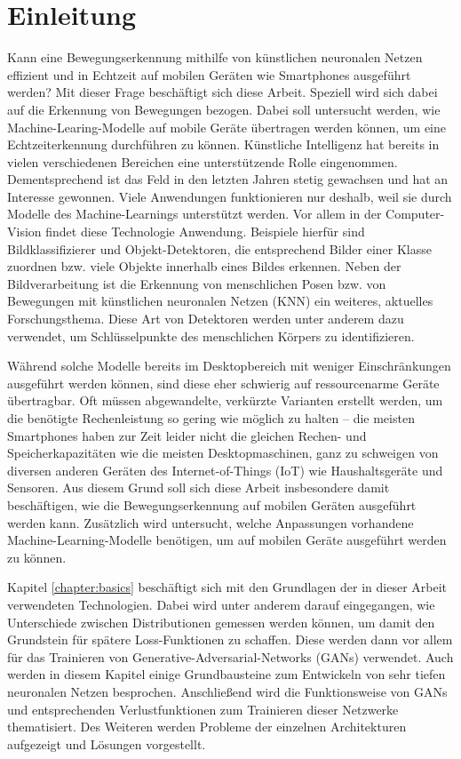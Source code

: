 \chapter{Einleitung}
Kann eine Bewegungserkennung mithilfe von künstlichen neuronalen Netzen
effizient und in Echtzeit auf mobilen Geräten wie Smartphones ausgeführt
werden? Mit dieser Frage beschäftigt sich diese Arbeit. Speziell wird
sich dabei auf die Erkennung von Bewegungen bezogen. Dabei soll untersucht
werden, wie Machine-Learing-Modelle auf mobile Geräte übertragen werden können,
um eine Echtzeiterkennung durchführen zu können. Künstliche Intelligenz hat
bereits in vielen verschiedenen Bereichen eine unterstützende Rolle
eingenommen.  Dementsprechend ist das Feld in den letzten Jahren stetig
gewachsen und hat an Interesse gewonnen. Viele Anwendungen funktionieren nur
deshalb, weil sie durch Modelle des Machine-Learnings unterstützt werden. Vor
allem in der Computer-Vision findet diese Technologie Anwendung. Beispiele
hierfür sind Bildklassifizierer und Objekt-Detektoren, die entsprechend Bilder
einer Klasse zuordnen bzw. viele Objekte innerhalb eines Bildes erkennen. Neben
der Bildverarbeitung ist die Erkennung von menschlichen Posen bzw. von
Bewegungen mit künstlichen neuronalen Netzen (KNN) ein weiteres, aktuelles
Forschungsthema. Diese Art von Detektoren werden unter anderem dazu verwendet,
um Schlüs\-sel\-punkte des menschlichen Körpers zu identifizieren.

Während solche Modelle bereits im Desktopbereich mit weniger Einschränkungen
ausgeführt werden können, sind diese eher schwierig auf ressourcenarme Geräte
übertragbar. Oft müssen abgewandelte, verkürzte Varianten erstellt werden, um
die benötigte Rechenleistung so gering wie möglich zu halten -- die meisten
Smartphones haben zur Zeit leider nicht die gleichen Rechen- und
Speicherkapazitäten wie die meisten Desktopmaschinen, ganz zu schweigen von
diversen anderen Geräten des Internet-of-Things (IoT) wie Haushaltsgeräte und
Sensoren. Aus diesem Grund soll sich diese Arbeit insbesondere damit
beschäftigen, wie die Bewegungserkennung auf mobilen Geräten ausgeführt werden
kann. Zusätzlich wird untersucht, welche Anpassungen vorhandene
Machine-Learning-Modelle benötigen, um auf mobilen Geräte ausgeführt werden zu
können.

Kapitel \ref{chapter:basics} beschäftigt sich mit den Grundlagen der in dieser
Arbeit verwendeten Technologien. Dabei wird unter anderem darauf eingegangen,
wie Unterschiede zwischen Distributionen gemessen werden können, um damit den
Grundstein für spätere Loss-Funktionen zu schaffen. Diese werden dann vor allem
für das Trainieren von Generative-Adversarial-Networks (GANs) verwendet. Auch
werden in diesem Kapitel einige Grundbausteine zum Entwickeln von sehr tiefen
neuronalen Netzen besprochen. Anschließend wird die Funktionsweise von GANs und
entsprechenden Verlustfunktionen zum Trainieren dieser Netzwerke thematisiert.
Des Weiteren werden Probleme der einzelnen Architekturen aufgezeigt und Lösungen
vorgestellt.


